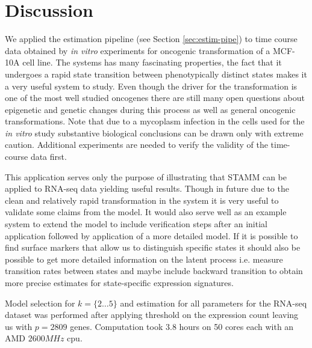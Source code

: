 \section{Discussion}
\label{sec:discussion-onco}

We applied the estimation pipeline (see Section \ref{sec:estim-pipe}) to time course data obtained by {\it in vitro} experiments for oncogenic transformation of a MCF-10A cell line. The systems has many fascinating properties, the fact that it undergoes a rapid state transition between phenotypically distinct states makes it a very useful system to study. Even though the driver for the transformation is one of the most well studied oncogenes there are still many open questions about epigenetic and genetic changes  during this process as well as general oncogenic transformations. Note that due to a mycoplasm infection in  the cells used for the {\it in vitro} study substantive  biological conclusions can be drawn only with extreme caution. Additional experiments are needed to verify the validity of the time-course data first.

This application serves only the purpose of illustrating that STAMM can be applied to RNA-seq data yielding useful results. Though in future due to the clean and relatively rapid transformation in the system it is very useful to validate some claims from the model. It would also serve well as an example system to extend the model to include verification steps after an initial application followed by application of a more detailed model. If it is possible to find surface markers that allow us to distinguish specific states it should also be possible to get more detailed information on the latent process i.e. measure transition rates between states and maybe include backward transition to obtain more precise estimates for state-specific expression signatures.


Model selection for $k = \lbrace 2 \ldots 5 \rbrace$ and estimation for all parameters for the RNA-seq dataset was performed after applying threshold on the expression count leaving us with $p=2809$ genes. Computation took $3.8$ hours on 50 cores each with an AMD $2600MHz$ cpu.



